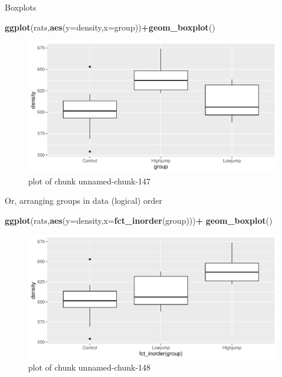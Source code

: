 \documentclass[ignorenonframetext,]{beamer}
\newenvironment{Shaded}{\begin{snugshade}}{\end{snugshade}}
\newcommand{\DataTypeTok}[1]{\textcolor[rgb]{0.13,0.29,0.53}{#1}}
\newcommand{\KeywordTok}[1]{\textcolor[rgb]{0.13,0.29,0.53}{\textbf{#1}}}
\newcommand{\NormalTok}[1]{#1}
\newcommand{\OperatorTok}[1]{\textcolor[rgb]{0.81,0.36,0.00}{\textbf{#1}}}
\begin{document}
\begin{frame}[fragile]{Boxplots}
\protect\hypertarget{boxplots-1}{}

\begin{Shaded}
\begin{Highlighting}[]
\KeywordTok{ggplot}\NormalTok{(rats,}\KeywordTok{aes}\NormalTok{(}\DataTypeTok{y=}\NormalTok{density,}\DataTypeTok{x=}\NormalTok{group))}\OperatorTok{+}\KeywordTok{geom_boxplot}\NormalTok{()}
\end{Highlighting}
\end{Shaded}

\begin{figure}
\centering
\includegraphics{figure/unnamed-chunk-147-1.pdf}
\caption{plot of chunk unnamed-chunk-147}
\end{figure}

\end{frame}

\begin{frame}[fragile]{Or, arranging groups in data (logical) order}
\protect\hypertarget{or-arranging-groups-in-data-logical-order}{}

\begin{Shaded}
\begin{Highlighting}[]
\KeywordTok{ggplot}\NormalTok{(rats,}\KeywordTok{aes}\NormalTok{(}\DataTypeTok{y=}\NormalTok{density,}\DataTypeTok{x=}\KeywordTok{fct_inorder}\NormalTok{(group)))}\OperatorTok{+}
\KeywordTok{geom_boxplot}\NormalTok{()}
\end{Highlighting}
\end{Shaded}

\begin{figure}
\centering
\includegraphics{figure/unnamed-chunk-148-1.pdf}
\caption{plot of chunk unnamed-chunk-148}
\end{figure}

\end{frame}
\end{document}
